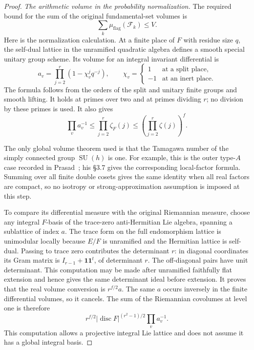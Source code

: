 \begin{proof}
\emph{The arithmetic volume in the probability normalization.}
The required bound for the sum of the original fundamental-set
volumes is
\begin{equation}\label{eq:actual-upper-mass}
             \sum_k\mu_{\mathrm{flag}}(\mathcal F_k)\le V.
\end{equation}
Here is the normalization calculation.  At a finite place of $F$
with residue size $q$, the self-dual lattice in the unramified
quadratic algebra defines a smooth special unitary group scheme.
Its volume for an integral invariant differential is
\[
 a_v=\prod_{j=2}^r(1-\chi_v^j q^{-j}),
 \qquad
 \chi_v=\begin{cases}1&\text{at a split place},\\-1&\text{at an inert place}.
                    \end{cases}
\]
The formula follows from the orders of the split and unitary
finite groups and smooth lifting.  It holds at primes over two
and at primes dividing $r$; no division by these primes is used.
It also gives
\[
                 \prod_v a_v^{-1}
                   \le\prod_{j=2}^r\zeta_F(j)
                   \le\left(\prod_{j=2}^r\zeta(j)\right)^f.
\]

The only global volume theorem used is that the Tamagawa number
of the simply connected group $\operatorname{SU}(h)$ is one.
For example, this is the outer type-$A$ case recorded in
Prasad~\cite[\S3.3]{bergman-upper-prasad}; his \S3.7 gives the corresponding local-factor
formula.  Summing over all finite double cosets gives the same
identity when all real factors are compact, so no isotropy or
strong-approximation assumption is imposed at this step.

To compare its differential measure with the original Riemannian
measure, choose any integral $F$-basis of the trace-zero
anti-Hermitian Lie algebra, spanning a sublattice of index $a$.
The trace form on the full endomorphism lattice is unimodular
locally because $E/F$ is unramified and the Hermitian lattice is
self-dual.  Passing to trace zero contributes the determinant
$r$: in diagonal coordinates its Gram matrix is
$I_{r-1}+\mathbf1\mathbf1^t$, of determinant $r$.
The off-diagonal pairs have unit determinant.  This computation
may be made after unramified faithfully flat extension and hence
gives the same determinant ideal before extension.  It proves
that the real volume conversion is $r^{f/2}a$.
The same $a$ occurs inversely in the finite differential volumes,
so it cancels.  The sum of the Riemannian covolumes at level one is
therefore
\[
        r^{f/2}|\operatorname{disc}F|^{(r^2-1)/2}
                             \prod_v a_v^{-1}.
\]
This computation allows a projective integral Lie lattice and
does not assume it has a global integral basis.


\end{proof}
